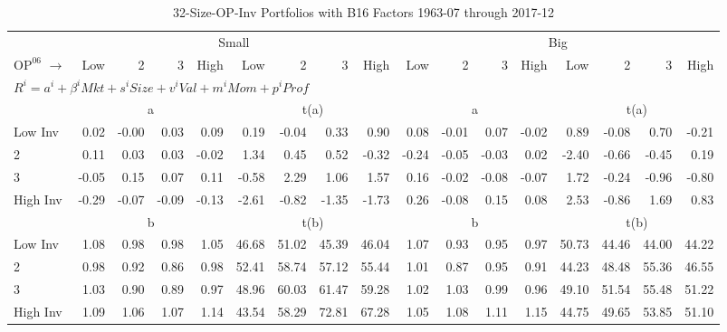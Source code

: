 
\begin{table}[!ht]
\footnotesize
\centering
\caption{32-Size-OP-Inv Portfolios with B16 Factors 1963-07 through 2017-12}
\begin{tabular}{lrrrrrrrrrrrrrrrr}
  \toprule
     & \multicolumn{8}{c}{Small} & \multicolumn{8}{c}{Big}  \\
     \cmidrule(r){2-9} \cmidrule(r){10-17}
    $\text{OP}^{06}$ $\rightarrow$ & Low & 2 & 3 & High & Low & 2 & 3 & High & Low & 2 & 3 & High & Low & 2 & 3 & High  \\ 
  \midrule
  \multicolumn{17}{l}{$R^i=a^i+\beta^iMkt+s^iSize+v^iVal+m^iMom+p^iProf$}  \\
  
     & \multicolumn{4}{c}{a} & \multicolumn{4}{c}{t(a)}  & \multicolumn{4}{c}{a} & \multicolumn{4}{c}{t(a)}   \\
     \cmidrule(r){2-5} \cmidrule(r){6-9}  \cmidrule(r){10-13} \cmidrule(r){14-17} 
    Low Inv  & 0.02  & -0.00  & 0.03  & 0.09  & 0.19  & -0.04  & 0.33  & 0.90  & 0.08  & -0.01  & 0.07  & -0.02  & 0.89  & -0.08  & 0.70  & -0.21   \\
    2  & 0.11  & 0.03  & 0.03  & -0.02  & 1.34  & 0.45  & 0.52  & -0.32  & -0.24  & -0.05  & -0.03  & 0.02  & -2.40  & -0.66  & -0.45  & 0.19   \\
    3  & -0.05  & 0.15  & 0.07  & 0.11  & -0.58  & 2.29  & 1.06  & 1.57  & 0.16  & -0.02  & -0.08  & -0.07  & 1.72  & -0.24  & -0.96  & -0.80   \\
    High Inv  & -0.29  & -0.07  & -0.09  & -0.13  & -2.61  & -0.82  & -1.35  & -1.73  & 0.26  & -0.08  & 0.15  & 0.08  & 2.53  & -0.86  & 1.69  & 0.83   \\
    
  
     & \multicolumn{4}{c}{b} & \multicolumn{4}{c}{t(b)}  & \multicolumn{4}{c}{b} & \multicolumn{4}{c}{t(b)}   \\
     \cmidrule(r){2-5} \cmidrule(r){6-9}  \cmidrule(r){10-13} \cmidrule(r){14-17} 
    Low Inv  & 1.08  & 0.98  & 0.98  & 1.05  & 46.68  & 51.02  & 45.39  & 46.04  & 1.07  & 0.93  & 0.95  & 0.97  & 50.73  & 44.46  & 44.00  & 44.22   \\
    2  & 0.98  & 0.92  & 0.86  & 0.98  & 52.41  & 58.74  & 57.12  & 55.44  & 1.01  & 0.87  & 0.95  & 0.91  & 44.23  & 48.48  & 55.36  & 46.55   \\
    3  & 1.03  & 0.90  & 0.89  & 0.97  & 48.96  & 60.03  & 61.47  & 59.28  & 1.02  & 1.03  & 0.99  & 0.96  & 49.10  & 51.54  & 55.48  & 51.22   \\
    High Inv  & 1.09  & 1.06  & 1.07  & 1.14  & 43.54  & 58.29  & 72.81  & 67.28  & 1.05  & 1.08  & 1.11  & 1.15  & 44.75  & 49.65  & 53.85  & 51.10   \\
    

\end{tabular}
\end{table}
